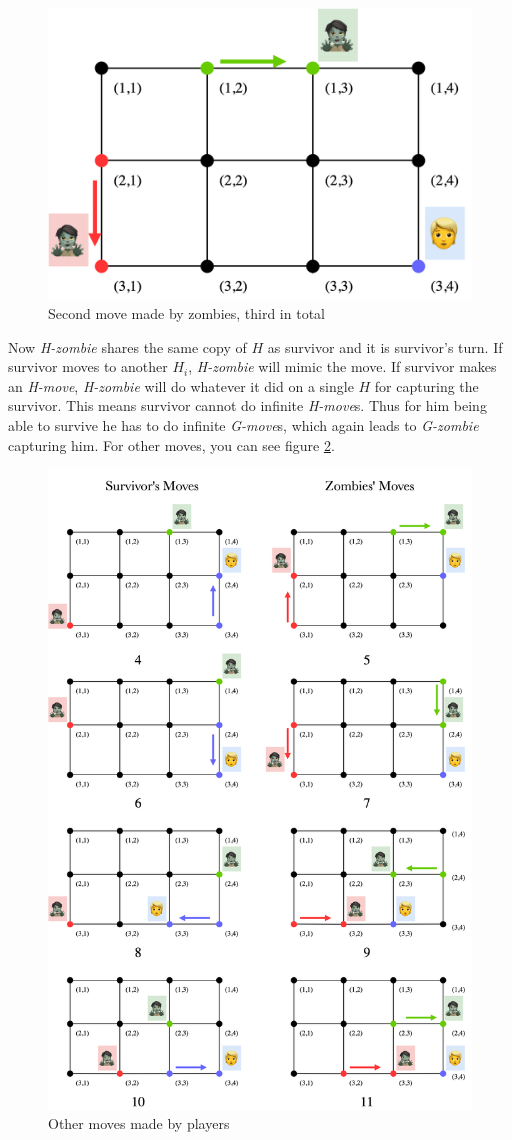 \documentclass[1p]{elsarticle}
\begin{document}
\begin{figure}[h!]
	\centering
	\includegraphics[width=0.5\linewidth]{fig/p34m3.png}
	\caption{Second move made by zombies, third in total}
	\label{fig:p5}
\end{figure}

Now {\it H-zombie} shares the same copy of $H$ as survivor and it is survivor's turn. If survivor moves to another
$H_i$, {\it H-zombie} will mimic the move. If survivor makes an {\it H-move}, {\it H-zombie} will do whatever it did on
a single $H$ for capturing the survivor. This means survivor cannot do infinite {\it H-move}s. Thus for him being able
to survive he has to do infinite {\it G-move}s, which again leads to {\it G-zombie} capturing him. For other moves, you
can see figure \ref{fig:p6}.

\begin{figure}[h!]
	\centering
	\includegraphics[width=1\linewidth]{fig/p34m6.png}
	\caption{Other moves made by players}
	\label{fig:p6}
\end{figure}

	
\end{document}
